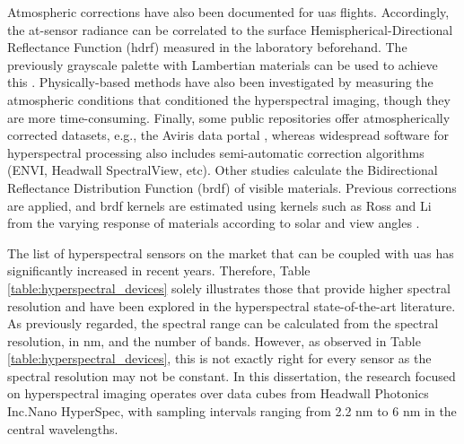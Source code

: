 Atmospheric corrections have also been documented for \acrshort{uas} flights. Accordingly, the at-sensor radiance can be correlated to the surface Hemispherical-Directional Reflectance Function (\acrshort{hdrf}) measured in the laboratory beforehand. The previously grayscale palette with Lambertian materials can be used to achieve this \cite{lucieer_hyperuasimaging_2014}. Physically-based methods have also been investigated by measuring the atmospheric conditions that conditioned the hyperspectral imaging, though they are more time-consuming. Finally, some public repositories offer atmospherically corrected datasets, e.g., the Aviris data portal \cite{california_institute_of_technology_aviris_nodate}, whereas widespread software for hyperspectral processing also includes semi-automatic correction algorithms (ENVI, Headwall SpectralView, etc). Other studies calculate the Bidirectional Reflectance Distribution Function (\acrshort{brdf}) of visible materials. Previous corrections are applied, and \acrshort{brdf} kernels are estimated using kernels such as Ross and Li from the varying response of materials according to solar and view angles \cite{queally_flexbrdf_2022, jia_kernel-driven_2020, sagan_data-driven_2022}.

The list of hyperspectral sensors on the market that can be coupled with \acrshort{uas} has significantly increased in recent years. Therefore, Table \ref{table:hyperspectral_devices} solely illustrates those that provide higher spectral resolution and have been explored in the hyperspectral state-of-the-art literature. As previously regarded, the spectral range can be calculated from the spectral resolution, in \si{\nano\meter}, and the number of bands. However, as observed in Table \ref{table:hyperspectral_devices}, this is not exactly right for every sensor as the spectral resolution may not be constant. In this dissertation, the research focused on hyperspectral imaging operates over data cubes from Headwall Photonics Inc.\textregistered Nano HyperSpec, with  sampling intervals ranging from 2.2 \si{\nano\meter} to 6 \si{\nano\meter} in the central wavelengths.

